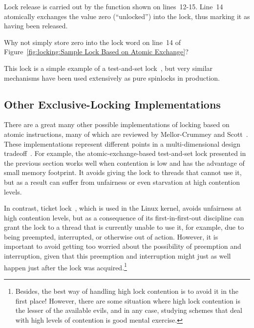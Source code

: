 Lock release is carried out by the  function
shown on lines~12-15.
Line~14 atomically exchanges the value zero (``unlocked'') into
the lock, thus marking it as having been released.

\QuickQuiz{}
	Why not simply store zero into the lock word on line~14 of
	Figure~\ref{fig:locking:Sample Lock Based on Atomic Exchange}?
 \QuickQuizEnd

This lock is a simple example of a test-and-set lock~\cite{Segall84},
but very similar
mechanisms have been used extensively as pure spinlocks in production.

\subsection{Other Exclusive-Locking Implementations}
\label{sec:locking:Other Exclusive-Locking Implementations}

There are a great many other possible implementations of locking
based on atomic instructions, many of which are reviewed
by Mellor-Crummey and Scott~\cite{MellorCrummey91a}.
These implementations represent different points in a multi-dimensional
design tradeoff~\cite{McKenney96a}.
For example,
the atomic-exchange-based test-and-set lock presented in the previous
section works well when contention is low and has the advantage
of small memory footprint.
It avoids giving the lock to threads that cannot use it, but as
a result can suffer from unfairness or even starvation at high
contention levels.

In contrast, ticket lock~\cite{MellorCrummey91a}, which is used in the Linux
kernel, avoids unfairness at high contention levels, but as a
consequence of its first-in-first-out discipline can grant the
lock to a thread that is currently unable to use it, for example,
due to being preempted, interrupted, or otherwise out of action.
However, it is important to avoid getting too worried about the
possibility of preemption and interruption, given that this preemption
and interruption might just as well happen just after the lock was
acquired.\footnote{
	Besides, the best way of handling high lock contention is to avoid
	it in the first place!
	However, there are some situation where high lock contention
	is the lesser of the available evils, and in any case, studying
	schemes that deal with high levels of contention is good mental
	exercise.}

